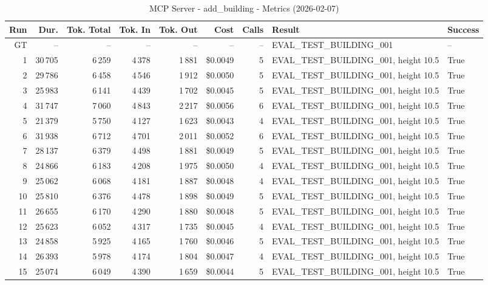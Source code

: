 \documentclass[a4paper,11pt]{article}
\begin{document}
\begin{table}[ht]
\centering
\scriptsize
\caption{MCP Server - add\_building - Metrics (2026-02-07)}
\label{tab:mcp\_add\_building\_metrics\_2026-02-07}
\begin{tabular}{r r r r r r r p{3cm} l}
\hline
Run & Dur. & Tok. Total & Tok. In & Tok. Out & Cost & Calls & Result & Success \\
\hline
GT & -- & -- & -- & -- & -- & -- & EVAL\_TEST\_BUILDING\_001 & -- \\
1 & 30\,705 & 6\,259 & 4\,378 & 1\,881 & \$0.0049 & 5 & EVAL\_TEST\_BUILDING\_001, height 10.5 & True \\
2 & 29\,786 & 6\,458 & 4\,546 & 1\,912 & \$0.0050 & 5 & EVAL\_TEST\_BUILDING\_001, height 10.5 & True \\
3 & 25\,983 & 6\,141 & 4\,439 & 1\,702 & \$0.0045 & 5 & EVAL\_TEST\_BUILDING\_001, height 10.5 & True \\
4 & 31\,747 & 7\,060 & 4\,843 & 2\,217 & \$0.0056 & 6 & EVAL\_TEST\_BUILDING\_001, height 10.5 & True \\
5 & 21\,379 & 5\,750 & 4\,127 & 1\,623 & \$0.0043 & 4 & EVAL\_TEST\_BUILDING\_001, height 10.5 & True \\
6 & 31\,938 & 6\,712 & 4\,701 & 2\,011 & \$0.0052 & 6 & EVAL\_TEST\_BUILDING\_001, height 10.5 & True \\
7 & 28\,137 & 6\,379 & 4\,498 & 1\,881 & \$0.0049 & 5 & EVAL\_TEST\_BUILDING\_001, height 10.5 & True \\
8 & 24\,866 & 6\,183 & 4\,208 & 1\,975 & \$0.0050 & 4 & EVAL\_TEST\_BUILDING\_001, height 10.5 & True \\
9 & 25\,062 & 6\,068 & 4\,181 & 1\,887 & \$0.0048 & 4 & EVAL\_TEST\_BUILDING\_001, height 10.5 & True \\
10 & 25\,810 & 6\,376 & 4\,478 & 1\,898 & \$0.0049 & 5 & EVAL\_TEST\_BUILDING\_001, height 10.5 & True \\
11 & 26\,655 & 6\,170 & 4\,290 & 1\,880 & \$0.0048 & 5 & EVAL\_TEST\_BUILDING\_001, height 10.5 & True \\
12 & 25\,623 & 6\,052 & 4\,317 & 1\,735 & \$0.0045 & 4 & EVAL\_TEST\_BUILDING\_001, height 10.5 & True \\
13 & 24\,858 & 5\,925 & 4\,165 & 1\,760 & \$0.0046 & 5 & EVAL\_TEST\_BUILDING\_001, height 10.5 & True \\
14 & 26\,393 & 5\,978 & 4\,174 & 1\,804 & \$0.0047 & 4 & EVAL\_TEST\_BUILDING\_001, height 10.5 & True \\
15 & 25\,074 & 6\,049 & 4\,390 & 1\,659 & \$0.0044 & 5 & EVAL\_TEST\_BUILDING\_001, height 10.5 & True \\

\end{tabular}
\end{table}
\end{document}
